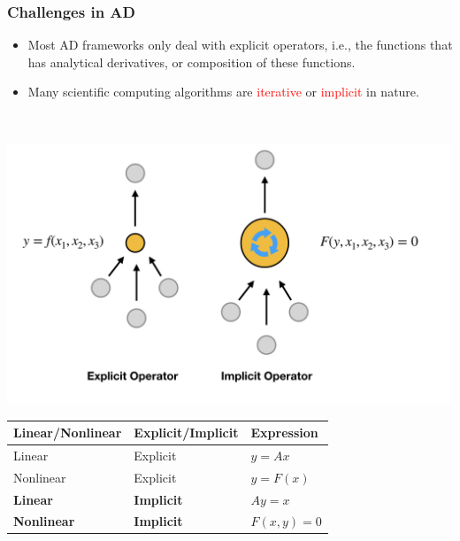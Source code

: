 \documentclass{beamer}
\begin{document}
\begin{frame}
\frametitle{Challenges in AD}
	
	
	\begin{minipage}[t]{0.49\textwidth}
	\vspace{-3cm}
\begin{itemize}
	\item Most AD frameworks only deal with explicit operators, i.e., the functions that has analytical derivatives, or composition of these functions. 
	\item Many scientific computing algorithms are \textcolor{red}{iterative} or \textcolor{red}{implicit} in nature.
\end{itemize}
\end{minipage}~
\begin{minipage}[t]{0.49\textwidth}
  \includegraphics[width=1.0\textwidth]{../sim.png}
\end{minipage}

\begin{table}[]
\begin{tabular}{@{}lll@{}}
\toprule
Linear/Nonlinear & Explicit/Implicit & Expression   \\ \midrule
Linear           & Explicit          & $y=Ax$       \\
Nonlinear        & Explicit          & $y = F(x)$   \\
\textbf{Linear}           & \textbf{Implicit}          & $Ay = x$     \\
\textbf{Nonlinear}        & \textbf{Implicit}          & $F(x,y) = 0$ \\ \bottomrule
\end{tabular}
\end{table}
\end{frame}
\end{document}
